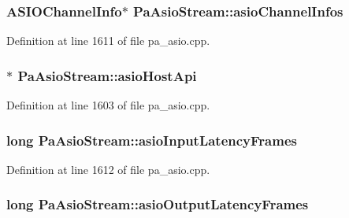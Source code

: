 \subsubsection[{\texorpdfstring{asio\+Channel\+Infos}{asioChannelInfos}}]{\setlength{\rightskip}{0pt plus 5cm}A\+S\+I\+O\+Channel\+Info$\ast$ Pa\+Asio\+Stream\+::asio\+Channel\+Infos}\hypertarget{struct_pa_asio_stream_a66dc7fa62cc467b47df44ccaa4580d6f}{}\label{struct_pa_asio_stream_a66dc7fa62cc467b47df44ccaa4580d6f}


Definition at line 1611 of file pa\+\_\+asio.\+cpp.

\subsubsection[{\texorpdfstring{asio\+Host\+Api}{asioHostApi}}]{$\ast$ Pa\+Asio\+Stream\+::asio\+Host\+Api}\hypertarget{struct_pa_asio_stream_aadaa880567a2dffd41250a28cdbf126f}{}\label{struct_pa_asio_stream_aadaa880567a2dffd41250a28cdbf126f}


Definition at line 1603 of file pa\+\_\+asio.\+cpp.

\subsubsection[{\texorpdfstring{asio\+Input\+Latency\+Frames}{asioInputLatencyFrames}}]{\setlength{\rightskip}{0pt plus 5cm}long Pa\+Asio\+Stream\+::asio\+Input\+Latency\+Frames}\hypertarget{struct_pa_asio_stream_a069cea1d45e377a6763350a3b0de5302}{}\label{struct_pa_asio_stream_a069cea1d45e377a6763350a3b0de5302}


Definition at line 1612 of file pa\+\_\+asio.\+cpp.

\subsubsection[{\texorpdfstring{asio\+Output\+Latency\+Frames}{asioOutputLatencyFrames}}]{\setlength{\rightskip}{0pt plus 5cm}long Pa\+Asio\+Stream\+::asio\+Output\+Latency\+Frames}\hypertarget{struct_pa_asio_stream_a27a6dcaf68446e88becd22c68152fa60}{}\label{struct_pa_asio_stream_a27a6dcaf68446e88becd22c68152fa60}


